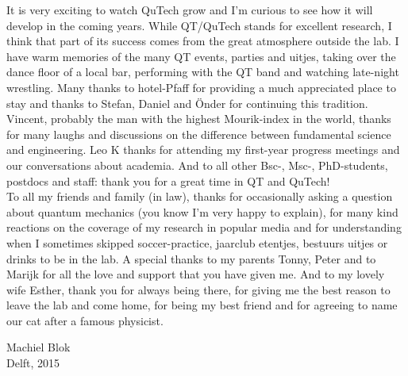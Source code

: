 It is very exciting to watch QuTech grow and I'm curious to see how it will develop in the coming years. While QT/QuTech stands for excellent research, I think that part of its success comes from the great atmosphere outside the lab. I have warm memories of the many QT events, parties and uitjes, taking over the dance floor of a local bar, performing with the QT band and watching late-night wrestling. Many thanks to hotel-Pfaff for providing a much appreciated place to stay and thanks to Stefan, Daniel and \"{O}nder for continuing this tradition. Vincent, probably the man with the highest Mourik-index in the world, thanks for many laughs and discussions on the difference between fundamental science and engineering. Leo K thanks for attending my first-year progress meetings and our conversations about academia. And to all other Bsc-, Msc-, PhD-students, postdocs and staff: thank you for a great time in QT and QuTech! \\

To all my friends and family (in law), thanks for occasionally asking a question about quantum mechanics (you know I'm very happy to explain), for many kind reactions on the coverage of my research in popular media and for understanding when I sometimes skipped soccer-practice, jaarclub etentjes, bestuurs uitjes or drinks to be in the lab. A special thanks to my parents Tonny, Peter and to Marijk for all the love and support that you have given me. And to my lovely wife Esther, thank you for always being there, for giving me the best reason to leave the lab and come home, for being my best friend and for agreeing to name our cat after a famous physicist. 

\begin{flushright}
Machiel Blok\\
Delft, 2015
\end{flushright}
%